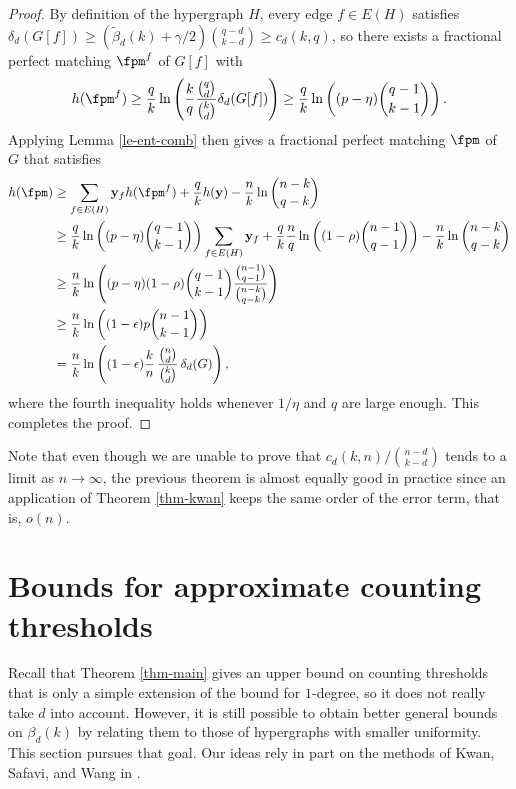 \documentclass[11pt]{article}
\newcommand{\fpmy}{\mathbf{y}}
\newcommand{\ctinf}{\tilde{\beta}_d(k)}
\begin{document}
\begin{proof}
    By definition of the hypergraph $H$, every edge $f\in E(H)$ satisfies $\delta_d(G[f])\ge (\ctinf+\gamma/2)\binom{q-d}{k-d}\ge c_d(k,q)$, so there exists a fractional perfect matching $\fpm^f$ of $G[f]$ with
    $$h(\fpm^f)\ge \frac{q}{k }\ln\left(\frac{k }{q}\frac{\binom{q}{d}}{\binom{k}{d }}\delta_d(G[f])\right)\ge \frac{q}{k }\ln\left((p-\eta)\binom{q-1}{k-1}\right).$$
    Applying Lemma \ref{le-ent-comb} then gives a fractional perfect matching $\fpm$ of $G$ that satisfies
    \begin{align*}
        h(\fpm) &\ge \sum_{f\in E(H)}\fpmy_f h(\fpm^f)+\frac{q}{k}h(\fpmy)-\frac{n }{k }\ln\binom{n-k}{q-k} \\
        &\ge \frac{q}{k }\ln\left((p-\eta)\binom{q-1}{k-1}\right)\sum_{f\in E(H)} \fpmy_f+\frac{q}{k }\frac{n }{q}\ln\left((1-\rho)\binom{n-1}{q-1}\right)-\frac{n }{k }\ln\binom{n-k}{q-k} \\
        &\ge \frac{n }{k }\ln\left((p-\eta)(1-\rho)\binom{q-1}{k-1}\frac{\binom{n-1}{q-1}}{\binom{n-k}{q-k}}\right) \\
        &\ge \frac{n }{k }\ln\left((1-\epsilon)p\binom{n-1}{k-1}\right) \\
        &= \frac{n }{k }\ln\left((1-\epsilon)\frac{k}{n}\,\frac{\binom{n}{d}}{\binom{k}{d}}\,\delta_d(G)\right),
    \end{align*}
    where the fourth inequality holds whenever $1/\eta$ and $q$ are large enough. This completes the proof.
\end{proof}

Note that even though we are unable to prove that $c_d(k,n)/\binom{n-d}{k-d}$ tends to a limit as $n\to\infty$, the previous theorem is almost equally good in practice since an application of Theorem \ref{thm-kwan} keeps the same order of the error term, that is, $o(n)$.

\section{Bounds for approximate counting thresholds}\label{sec-approx-count}


Recall that Theorem \ref{thm-main} gives an upper bound on counting thresholds that is only a simple extension of the bound for $1$-degree, so it does not really take $d$ into account. However, it is still possible to obtain better general bounds on $\beta_d(k)$ by relating them to those of hypergraphs with smaller uniformity. This section pursues that goal. Our ideas rely in part on the methods of Kwan, Safavi, and Wang in \cite{kwan2026counting}.
\end{document}
